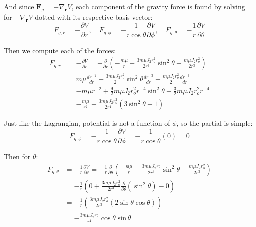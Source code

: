 \documentclass[titlepage]{article}
\begin{document}
And since $\boldsymbol{F}_g=-\nabla_{\boldsymbol{r}}V$, each component of the gravity force is found by solving for $-\nabla_{\boldsymbol{r}}V$ dotted with its respective basis vector:
\begin{equation}
	F_{g,r}=-\frac{\partial V}{\partial r},\quad F_{g,\phi}=-\frac{1}{r\cos\theta}\frac{\partial V}{\partial\phi},\quad F_{g,\theta}=-\frac{1}{r}\frac{\partial V}{\partial\theta}
\end{equation}

Then we compute each of the forces:
\begin{equation}
	\begin{split}
		F_{g,r}&=-\frac{\partial V}{\partial r}=-\frac{\partial}{\partial r}\left(-\frac{m\mu}{r}+\frac{3m\mu J_2r_o^2}{2r^3}\sin^2\theta-\frac{m\mu J_2r_o^2}{2r^3}\right) \\
		&=m\mu\frac{dr^{-1}}{dr}-\frac{3m\mu J_2r_o^2}{2}\sin^2\theta\frac{dr^{-3}}{dr}+\frac{m\mu J_2r_o^2}{2}\frac{dr^{-3}}{dr} \\
		&=-m\mu r^{-2}+\frac{9}{2}m\mu J_2r_o^2r^{-4}\sin^2\theta-\frac{3}{2}m\mu J_2r_o^2r^{-4} \\
		&=-\frac{m\mu}{r^2}+\frac{3m\mu J_2r_o^2}{2r^4}\left(3\sin^2\theta-1\right)
	\end{split}
\end{equation}

Just like the Lagrangian, potential is not a function of $\phi$, so the partial is simple:
\begin{equation}
	F_{g,\phi}=-\frac{1}{r\cos\theta}\frac{\partial V}{\partial\phi}=-\frac{1}{r\cos\theta}(0)=0
\end{equation}

Then for $\theta$:
\begin{equation}
	\begin{split}
		F_{g,\theta}&=-\frac{1}{r}\frac{\partial V}{\partial\theta}=-\frac{1}{r}\frac{\partial}{\partial\theta}\left(-\frac{m\mu}{r}+\frac{3m\mu J_2r_o^2}{2r^3}\sin^2\theta-\frac{m\mu J_2r_o^2}{2r^3}\right) \\
		&=-\frac{1}{r}\left(0+\frac{3m\mu J_2r_o^2}{2r^3}\frac{\partial}{\partial\theta}\left(\sin^2\theta\right)-0\right) \\
		&=-\frac{1}{r}\left(\frac{3m\mu J_2r_o^2}{2r^3}\left(2\sin\theta\cos\theta\right)\right) \\
		&=-\frac{3m\mu J_2r_o^2}{r^4}\cos\theta\sin\theta
	\end{split}
\end{equation}
\end{document}
